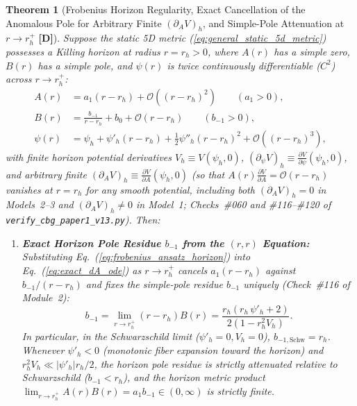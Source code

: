 \documentclass[11pt,a4paper]{article}
\newcommand{\catD}{\textbf{\textcolor{blue!75!black}{[D]}}}
\newtheorem{theorem}{Theorem}[section]
\theoremstyle{definition}
\theoremstyle{remark}
\begin{document}
\begin{theorem}[Frobenius Horizon Regularity, Exact Cancellation of the Anomalous Pole for Arbitrary Finite $(\partial_A V)_h$, and Simple-Pole Attenuation at $r \to r_h^+$ \catD]
\label{thm:frobenius_horizon_regularity}
Suppose the static 5D metric (\ref{eq:general_static_5d_metric}) possesses a Killing horizon at radius $r = r_h > 0$, where $A(r)$ has a simple zero, $B(r)$ has a simple pole, and $\psi(r)$ is twice continuously differentiable ($C^2$) across $r \to r_h^+$:
\begin{align}
  A(r) &= a_1\left(r - r_h\right) + \mathcal{O}\!\left((r - r_h)^2\right) \qquad (a_1 > 0), \nonumber \\[3pt]
  B(r) &= \frac{b_{-1}}{r - r_h} + b_0 + \mathcal{O}\!\left(r - r_h\right) \qquad (b_{-1} > 0), \nonumber \\[3pt]
  \psi(r) &= \psi_h + \psi'_h\left(r - r_h\right) + \frac{1}{2}\psi''_h\left(r - r_h\right)^2 + \mathcal{O}\!\left((r - r_h)^3\right),
  \label{eq:frobenius_ansatz_horizon}
\end{align}
with finite horizon potential derivatives $V_h \equiv V(\psi_h, 0)$, $(\partial_{\psi}V)_h \equiv \frac{\partial V}{\partial\psi}(\psi_h, 0)$, and arbitrary finite $(\partial_A V)_h \equiv \frac{\partial V}{\partial A}(\psi_h, 0)$ (so that $A(r)\frac{\partial V}{\partial A} = \mathcal{O}(r - r_h)$ vanishes at $r = r_h$ for any smooth potential, including both $(\partial_A V)_h = 0$ in Models~2--3 and $(\partial_A V)_h \neq 0$ in Model~1; Checks~\#060 and \#116--\#120 of \texttt{verify\_cbg\_paper1\_v13.py}). Then:
\begin{enumerate}
  \item[\textnormal{(i)}] \textbf{Exact Horizon Pole Residue $b_{-1}$ from the $(r,r)$ Equation:} Substituting Eq.~(\ref{eq:frobenius_ansatz_horizon}) into Eq.~(\ref{eq:exact_dA_ode}) as $r \to r_h^+$ cancels $a_1(r - r_h)$ against $b_{-1}/(r - r_h)$ and fixes the simple-pole residue $b_{-1}$ uniquely (Check~\#116 of Module~2):
  \begin{equation}
    b_{-1} = \lim_{r \to r_h^+}\left(r - r_h\right)B(r) = \frac{r_h\left(r_h\,\psi'_h + 2\right)}{2\left(1 - r_h^2 V_h\right)}.
    \label{eq:frob_bm1}
  \end{equation}
  In particular, in the Schwarzschild limit ($\psi'_h = 0, V_h = 0$), $b_{-1,\text{Schw}} = r_h$. Whenever $\psi'_h < 0$ (monotonic fiber expansion toward the horizon) and $r_h^2 V_h \ll |\psi'_h| r_h / 2$, the horizon pole residue is strictly attenuated relative to Schwarzschild ($b_{-1} < r_h$), and the horizon metric product $\lim_{r\to r_h^+} A(r)B(r) = a_1 b_{-1} \in (0, \infty)$ is strictly finite.

\end{enumerate}
\end{theorem}
\end{document}
